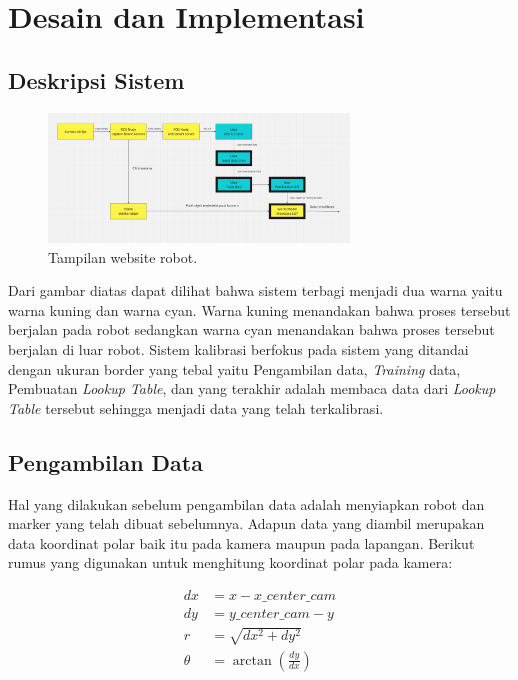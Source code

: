 \section{Desain dan Implementasi}
\label{sec:desaindanimplementasi}

\subsection{Deskripsi Sistem}
\label{sec:deskripsisistem}

\begin{figure}[ht]
  \centering
  \includegraphics[width=8cm]{gambar/desain_sistem_vfix.png}
  \caption{Tampilan website robot.}
  \label{fig:webrobot}
\end{figure}
Dari gambar diatas dapat dilihat bahwa sistem terbagi menjadi dua warna yaitu warna kuning dan warna cyan. Warna kuning menandakan bahwa proses tersebut berjalan pada robot sedangkan warna cyan menandakan bahwa proses tersebut berjalan di luar robot. Sistem kalibrasi berfokus pada sistem yang ditandai dengan ukuran border yang tebal yaitu Pengambilan data, \textit{Training} data, Pembuatan \textit{Lookup Table}, dan yang terakhir adalah membaca data dari \textit{Lookup Table} tersebut sehingga menjadi data yang telah terkalibrasi. 

\subsection{Pengambilan Data
  \label{sec:pengambilandata}}

Hal yang dilakukan sebelum pengambilan data adalah menyiapkan robot dan marker yang telah dibuat sebelumnya. Adapun data yang diambil merupakan data koordinat polar baik itu pada kamera maupun pada lapangan. Berikut rumus yang digunakan untuk menghitung koordinat polar pada kamera: 

\begin{equation}
  \begin{aligned}
    dx &= x - x\_center\_cam \\ 
    dy &= y\_center\_cam - y \\
    r &= \sqrt{dx^2 + dy^2} \\
    \theta &= \arctan(\frac{dy}{dx})
  \end{aligned}
\end{equation}

